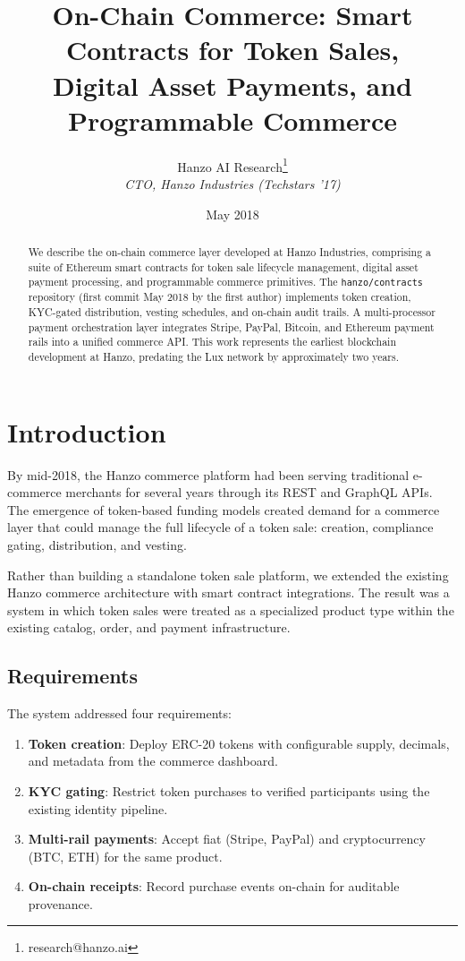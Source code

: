 \documentclass[11pt,a4paper]{article}
\title{On-Chain Commerce: Smart Contracts for Token Sales,\\Digital Asset Payments, and Programmable Commerce}
\author{Hanzo AI Research\thanks{research@hanzo.ai} \\ \textit{CTO, Hanzo Industries (Techstars '17)}}
\date{May 2018}
\begin{document}
\hanzocoverpage

\begin{abstract}
We describe the on-chain commerce layer developed at Hanzo Industries, comprising a suite of Ethereum smart contracts for token sale lifecycle management, digital asset payment processing, and programmable commerce primitives. The \texttt{hanzo/contracts} repository (first commit May 2018 by the first author) implements token creation, KYC-gated distribution, vesting schedules, and on-chain audit trails. A multi-processor payment orchestration layer integrates Stripe, PayPal, Bitcoin, and Ethereum payment rails into a unified commerce API. This work represents the earliest blockchain development at Hanzo, predating the Lux network by approximately two years.
\end{abstract}

\section{Introduction}

By mid-2018, the Hanzo commerce platform had been serving traditional e-commerce merchants for several years through its REST and GraphQL APIs. The emergence of token-based funding models created demand for a commerce layer that could manage the full lifecycle of a token sale: creation, compliance gating, distribution, and vesting.

Rather than building a standalone token sale platform, we extended the existing Hanzo commerce architecture with smart contract integrations. The result was a system in which token sales were treated as a specialized product type within the existing catalog, order, and payment infrastructure.

\subsection{Requirements}

The system addressed four requirements:
\begin{enumerate}
    \item \textbf{Token creation}: Deploy ERC-20 tokens with configurable supply, decimals, and metadata from the commerce dashboard.
    \item \textbf{KYC gating}: Restrict token purchases to verified participants using the existing identity pipeline.
    \item \textbf{Multi-rail payments}: Accept fiat (Stripe, PayPal) and cryptocurrency (BTC, ETH) for the same product.
    \item \textbf{On-chain receipts}: Record purchase events on-chain for auditable provenance.
\end{enumerate}
\end{document}
